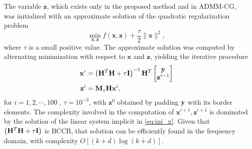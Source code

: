 \documentclass[10pt,twocolumn,twoside]{IEEEtran}
\newcommand{\Hm}{\mathbf{H}} %
\newcommand{\y}{\mathbf{y}} %
\newcommand{\x}{\mathbf{x}} %
\newcommand{\z}{\mathbf{z}} %
\begin{document}
The variable $\z$, which exists only in the proposed method and in ADMM-CG, was initialized with an approximate solution of the  quadratic regularization problem
\begin{equation*}
	 \min_{\x,\z} f(\x,\z) + \frac{\tau}{2}\|\x \|^2,
\end{equation*}
where $\tau$ is a small positive value.  The approximate solution was computed by alternating minimization with respect to  $\x$ and  $\z$, yielding the iterative procedure
\begin{align}
   \label{eq:ini_x}
   \x^i & = \left( \Hm^T\Hm + \tau{\bf I}\right)^{-1}\Hm^T
                        \begin{bmatrix}
                           \y \\
                           \z^{i-1}
                         \end{bmatrix}\\
  \label{eq:ini_z}
  \z^i & = {\bf M}_z\Hm \x^i,
\end{align}
for $i=1,2,\cdots,100$ , $\tau =10^{-3}$, with $\z^0$ obtained by padding $\bf y$ with its border elements.  The complexity involved in the computation of  $\x^{i+1},\z^{i+1}$ is dominated by the solution of the linear system implicit in \eqref{eq:ini_x}. Given that  $\left( \Hm^T\Hm + \tau{\bf I}\right)$ is BCCB, that solution can be efficiently found in the frequency domain, with complexity $O[(k+d) \log (k+d)]$.
\end{document}
